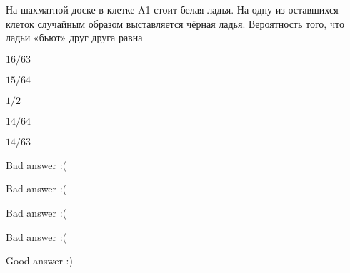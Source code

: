 
\begin{question}
На шахматной доске в клетке A1 стоит белая ладья. На одну из оставшихся
клеток случайным образом выставляется чёрная ладья. Вероятность того,
что ладьи «бьют» друг друга равна
\begin{answerlist}
  \item \(16/63\)
  \item \(15/64\)
  \item \(1/2\)
  \item \(14/64\)
  \item \(14/63\)
\end{answerlist}
\end{question}

\begin{solution}
\begin{answerlist}
  \item Bad answer :(
  \item Bad answer :(
  \item Bad answer :(
  \item Bad answer :(
  \item Good answer :)
\end{answerlist}
\end{solution}

